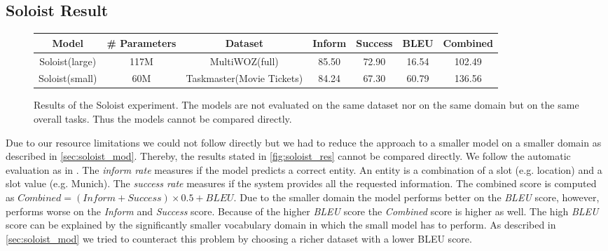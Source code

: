 \documentclass[twocolumn]{tum-article}
\begin{document}
\subsection{Soloist Result}
\begin{figure}[!h]
\centering
\begin{tabular}{c|c|c|c|c|c|c}
\hline
\textbf{Model} & \textbf{\# Parameters} & \textbf{Dataset} & \textbf{Inform} & \textbf{Success} & \textbf{BLEU} & \textbf{Combined}\\
\hline
Soloist(large) & 117M & MultiWOZ(full) & 85.50 & 72.90 & 16.54 & 102.49 \\
\hline
Soloist(small) & 60M & Taskmaster(Movie Tickets) & 84.24 & 67.30 & 60.79 & 136.56\\
\hline
\end{tabular}
\caption{Results of the Soloist experiment. The models are not evaluated on the same dataset nor on the same domain but on the same overall tasks. Thus the models cannot be compared directly. }
\label{fig:soloist_res}
\end{figure}
Due to our resource limitations we could not follow \cite{peng2020soloist} directly but we had to reduce the approach to a smaller model on a smaller domain as described in \autoref{sec:soloist_mod}. Thereby, the results stated in \autoref{fig:soloist_res} cannot be compared directly. 
We follow the automatic evaluation as in \cite{peng2020soloist, budzianowski2020multiwoz}. The \textit{inform rate} measures if the model predicts a correct entity. An entity is a combination of a slot (e.g. location) and a slot value (e.g. Munich). The \textit{success rate} measures if the system provides all the requested information. The combined score is computed as $Combined = (Inform + Success) \times 0.5 + BLEU$.
Due to the smaller domain the model performs better on the \textit{BLEU} score, however, performs worse on the \textit{Inform} and \textit{Success} score. Because of the higher \textit{BLEU} score the \textit{Combined} score is higher as well. 
The high \textit{BLEU} score can be explained by the significantly smaller vocabulary domain in which the small model has to perform. As described in \autoref{sec:soloist_mod} we tried to counteract this problem by choosing a richer dataset with a lower BLEU score.  
\end{document}

